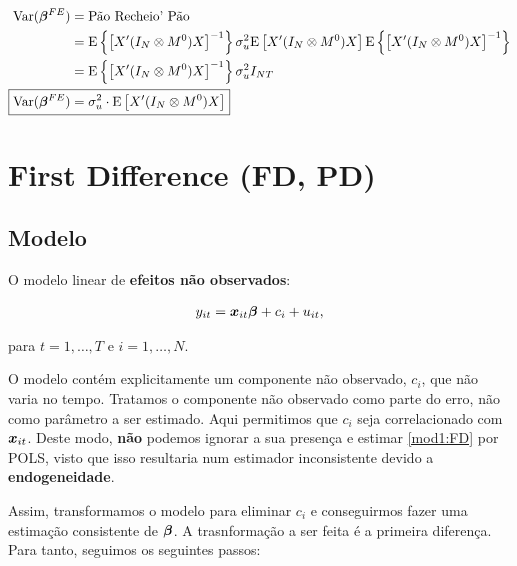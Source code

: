 \documentclass[11pt, oneside, a4paper, article]{article}
\numberwithin{equation}{section}
\begin{document}
\begin{description}
\noindent
{}

\vspace{-2 em}
\begin{align*}
\Var( \mbs{\beta}^{FE} ) &= \text{Pão Recheio' Pão} 
\\ &=
\E \left\{ \left[
X' ( I_{N} \otimes M^{0} ) X
\right]^{-1} \right\}
\sigma_{u}^{2} \E\left[ X' ( I_{N} \otimes M^{0} ) X \right]
\E \left\{ \left[
X' ( I_{N} \otimes M^{0} ) X
\right]^{-1} \right\}
\\  &=
\E \left\{ \left[
X' ( I_{N} \otimes M^{0} ) X
\right]^{-1} \right\}
\sigma_{u}^{2} I_{NT}
\\
\Aboxed{ \Var( \mbs{\beta}^{FE} ) &= \sigma_{u}^{2} \cdot  \E\left[ X' ( I_{N} \otimes M^{0} ) X \right] }
\end{align*}

\clearpage
\section{First Difference (FD, PD)}

\subsection{Modelo}

O modelo linear de \textbf{efeitos não observados}:

\vspace{-1 em}
\begin{align} \label{mod1:FD}
	y_{it} = \boldsymbol{x}_{it} \boldsymbol{\beta} + c_{i} + u_{it},
\end{align}

\noindent
para
$t = 1, \dots, T$ e $i = 1, \dots, N$.

O modelo contém explicitamente um componente não observado, $c_{i}$, que não varia no tempo.
Tratamos o componente não observado como parte do erro, não como parâmetro a ser estimado.
Aqui permitimos que $c_{i}$ seja correlacionado com $\boldsymbol{x}_{it}$.
Deste modo, \textbf{não} podemos ignorar a sua presença e estimar \eqref{mod1:FD} por POLS, visto que isso resultaria num estimador inconsistente devido a \textbf{endogeneidade}.

Assim, transformamos o modelo para eliminar $c_{i}$ e conseguirmos fazer uma estimação consistente de $\boldsymbol{\beta}$.
A trasnformação a ser feita é a primeira diferença.
Para tanto, seguimos os seguintes passos:


\end{description}
\end{document}
